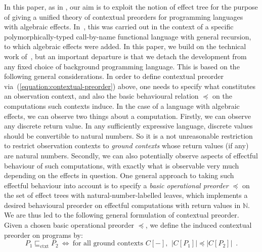 \documentclass[a4paper,UKenglish]{lipics-v2018}
\newcommand{\Nat}{\mathbb{N}}
\newcommand{\Trees}{\textnormal{Trees}}
\newcommand{\Basicleq}{\preccurlyeq}
\theoremstyle{plain}
\begin{document}
In this paper, as in  \cite{gom}, our aim is to exploit the notion of effect tree for the purpose of 
giving a unified theory of contextual preorders for programming languages with algebraic effects.
In~\cite{gom}, this was carried out in the context of a specific polymorphically-typed call-by-name functional language with general recursion, to which algebraic effects were added. In this paper, we build on the technical work of~\cite{gom}, but an important departure is that we detach the development from any fixed choice of background programming language. This is based on the following general considerations. In order to define contextual preorder via~(\ref{equation:contextual-preorder}) above, one needs to specify what constitutes an observation context, and also the basic behavioural relation $\Basicleq$ on the computations such contexts induce. In the case of a language with algebraic effects, we can observe two things about a computation. Firstly, we can observe any discrete return value. 
In any sufficiently expressive language, discrete values should be convertible to natural numbers. So it is a not unreasonable  restriction to restrict observation contexts to \emph{ground contexts} whose return values (if any) are natural numbers.  
Secondly, we can also potentially observe aspects of effectful behaviour of such  computations, with exactly what is observable very much depending on the effects in question. 
One general approach to taking such effectful behaviour into account is to  specify a  \emph{basic operational preorder} 
$\Basicleq$ on the set
of effect trees with natural-number-labelled leaves, which implements a desired behavioural preorder on
effectful computations with return values in $\mathbb{N}$.
 We are thus 
led to the following general formulation of contextual preorder. Given a chosen basic operational preorder
$\Basicleq$, we define the induced contextual preorder on programs by:
\begin{equation}
\label{equation:contextual-preorder-via-trees}
P_1 \sqsubseteq_\text{ctxt} P_2 ~ \iff ~
\text{for all ground contexts $C[-]$, $~ |C[P_1]| \Basicleq |C[P_2]|$} \enspace . 
\end{equation}
\end{document}
